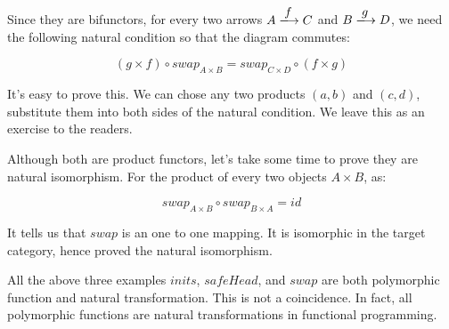 \documentclass{article}
\begin{document}
Since they are bifunctors, for every two arrows $A \arrowto{f} C$ and $B \arrowto{g} D$, we need the following natural condition so that the diagram commutes:


\[
(g \times f) \circ swap_{A \times B} = swap_{C \times D} \circ (f \times g)
\]

\begin{center}
\end{center}

It's easy to prove this. We can chose any two products $(a, b)$ and $(c, d)$, substitute them into both sides of the natural condition. We leave this as an exercise to the readers.

Although both are product functors, let's take some time to prove they are natural isomorphism. For the product of every two objects $A \times B$, as:

\[
swap_{A \times B} \circ swap_{B \times A} = id
\]

It tells us that $swap$ is an one to one mapping. It is isomorphic in the target category, hence proved the natural isomorphism.

All the above three examples $inits$, $safeHead$, and $swap$ are both polymorphic function and natural transformation. This is not a coincidence. In fact, all polymorphic functions are natural transformations in functional programming\cite{Wadler-1989}.

\begin{Exercise}
\end{Exercise}
\end{document}
